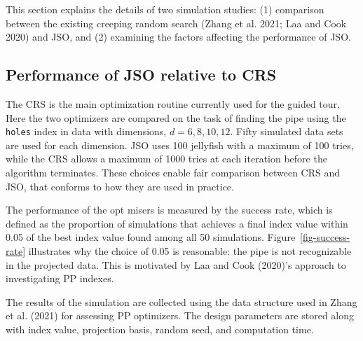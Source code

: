 \documentclass[
  12pt,
]{interact}
\theoremstyle{plain}
\begin{document}
This section explains the details of two simulation studies: (1)
comparison between the existing creeping random search (Zhang et al.
2021; Laa and Cook 2020) and JSO, and (2) examining the factors
affecting the performance of JSO.

\subsection{Performance of JSO relative to CRS}\label{sec-app-1}

The CRS is the main optimization routine currently used for the guided
tour. Here the two optimizers are compared on the task of finding the
pipe using the \texttt{holes} index in data with dimensions,
\(d = 6, 8, 10, 12\). Fifty simulated data sets are used for each
dimension. JSO uses 100 jellyfish with a maximum of 100 tries, while the
CRS allows a maximum of 1000 tries at each iteration before the
algorithm terminates. These choices enable fair comparison between CRS
and JSO, that conforms to how they are used in practice.

The performance of the opt misers is measured by the success rate, which
is defined as the proportion of simulations that achieves a final index
value within 0.05 of the best index value found among all 50
simulations. Figure~\ref{fig-success-rate} illustrates why the choice of
0.05 is reasonable: the pipe is not recognizable in the projected data.
This is motivated by Laa and Cook (2020)'s approach to investigating PP
indexes.

The results of the simulation are collected using the data structure
used in Zhang et al. (2021) for assessing PP optimizers. The design
parameters are stored along with index value, projection basis, random
seed, and computation time.
\end{document}
